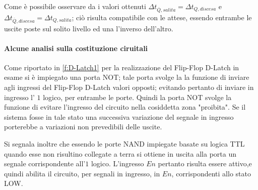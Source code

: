 	Come è possibile osservare da i valori ottenuti $\Delta t_{\overline{Q},salita} = \Delta t_{{Q},discesa}$ e $\Delta t_{\overline{Q},discesa} = \Delta t_{{Q},salita}$; ciò risulta compatibile con le attese, essendo entrambe le uscite poste sul solito livello ed una l'inverso dell'altro.
	\paragraph{Alcune analisi sulla costituzione ciruitali }
	Come riportato in \figurename{ \ref{f:D-Latch1}} per la realizzazione del Flip-Flop D-Latch in esame si è impiegato una porta NOT;
	tale porta svolge la la funzione di inviare agli ingressi del Flip-Flop D-Latch valori opposti; evitando pertanto di inviare in ingresso l' $1$ logico, per entrambe le porte.
	Quindi la porta NOT svolge la funzione di evitare l'ingresso del circuito nella cosiddetta zona "proibita".
	Se il sistema fosse in tale stato una successiva variazione del segnale in ingresso porterebbe a variazioni non prevedibili delle uscite.

	Si segnala inoltre che essendo le porte NAND impiegate basate su logica TTL quando esse non risultino collegate a terra si ottiene in uscita alla porta un segnale corrispondente all'$1$ logico.
	L'ingresso $En$ pertanto risulta essere attivo,e quindi abilita il circuito, per
	segnali in ingresso, in $En$, corrispondenti allo stato LOW.
